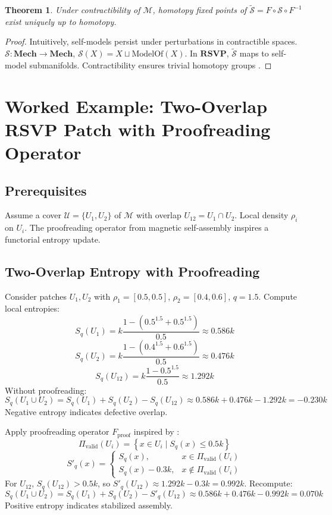 \documentclass{article}
\theoremstyle{plain}
\newtheorem{theorem}{Theorem}[section]
\theoremstyle{definition}
\begin{document}
\begin{theorem}
Under contractibility of $\mathcal{M}$, homotopy fixed points of $\widetilde{\mathcal{S}} = F \circ \mathcal{S} \circ F^{-1}$ exist uniquely up to homotopy.
\end{theorem}
\begin{proof}
Intuitively, self-models persist under perturbations in contractible spaces. $\mathcal{S}: \mathbf{Mech} \to \mathbf{Mech}$, $\mathcal{S}(X) = X \sqcup \text{ModelOf}(X)$. In $\mathbf{RSVP}$, $\widetilde{\mathcal{S}}$ maps to self-model submanifolds. Contractibility ensures trivial homotopy groups \cite{Awodey2010}.
\end{proof}

\section{Worked Example: Two-Overlap RSVP Patch with Proofreading Operator}

\subsection{Prerequisites}
Assume a cover $\mathcal{U} = \{U_1, U_2\}$ of $\mathcal{M}$ with overlap $U_{12} = U_1 \cap U_2$. Local density $\rho_i$ on $U_i$. The proofreading operator from magnetic self-assembly \cite{Liang2025} inspires a functorial entropy update.

\subsection{Two-Overlap Entropy with Proofreading}
Consider patches $U_1, U_2$ with $\rho_1 = [0.5, 0.5]$, $\rho_2 = [0.4, 0.6]$, $q = 1.5$. Compute local entropies:
\[
S_q(U_1) = k \frac{1 - \left(0.5^{1.5} + 0.5^{1.5}\right)}{0.5} \approx 0.586k
\]
\[
S_q(U_2) = k \frac{1 - \left(0.4^{1.5} + 0.6^{1.5}\right)}{0.5} \approx 0.476k
\]
\[
S_q(U_{12}) = k \frac{1 - 0.5^{1.5}}{0.5} \approx 1.292k
\]
Without proofreading:
\[
S_q(U_1 \cup U_2) = S_q(U_1) + S_q(U_2) - S_q(U_{12}) \approx 0.586k + 0.476k - 1.292k = -0.230k
\]
Negative entropy indicates defective overlap.

Apply proofreading operator $F_\text{proof}$ inspired by \cite{Liang2025}:
\[
\Pi_\text{valid}(U_i) = \left\{ x \in U_i \mid S_q(x) \le 0.5k \right\}
\]
\[
S'_q(x) = \begin{cases} S_q(x), & x \in \Pi_\text{valid}(U_i) \\ S_q(x) - 0.3k, & x \notin \Pi_\text{valid}(U_i) \end{cases}
\]
For $U_{12}$, $S_q(U_{12}) > 0.5k$, so $S'_q(U_{12}) \approx 1.292k - 0.3k = 0.992k$. Recompute:
\[
S_q(U_1 \cup U_2) = S_q(U_1) + S_q(U_2) - S'_q(U_{12}) \approx 0.586k + 0.476k - 0.992k = 0.070k
\]
Positive entropy indicates stabilized assembly.
\end{document}
